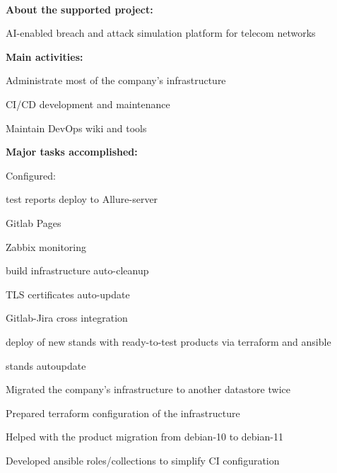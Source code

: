 \documentclass[a4paper]{MagicalCV}
\begin{document}
\begin{minipage}[t]{0.64\textwidth} 


 \\
\vspace{\topsep} %
\textbf{About the supported project:}
\begin{tightemize}
  \item AI-enabled breach and attack simulation platform for telecom networks
\end{tightemize}
\textbf{Main activities:}
\begin{tightemize}
  \item Administrate most of the company's infrastructure
  \item CI/CD development and maintenance
  \item Maintain DevOps wiki and tools
\end{tightemize}
\textbf{Major tasks accomplished:}
\begin{tightemize}
  \item Configured:
  \begin{tightemize}
    \item test reports deploy to Allure-server
    \item Gitlab Pages
    \item Zabbix monitoring
    \item build infrastructure auto-cleanup
    \item TLS certificates auto-update
    \item Gitlab-Jira cross integration
    \item deploy of new stands with ready-to-test products via terraform and ansible
    \item stands autoupdate
  \end{tightemize}
  \item Migrated the company's infrastructure to another datastore twice
  \item Prepared terraform configuration of the infrastructure
  \item Helped with the product migration from debian-10 to debian-11
  \item Developed ansible roles/collections to simplify CI configuration
\end{tightemize}
\sectionsep


\end{minipage}
\end{document}
